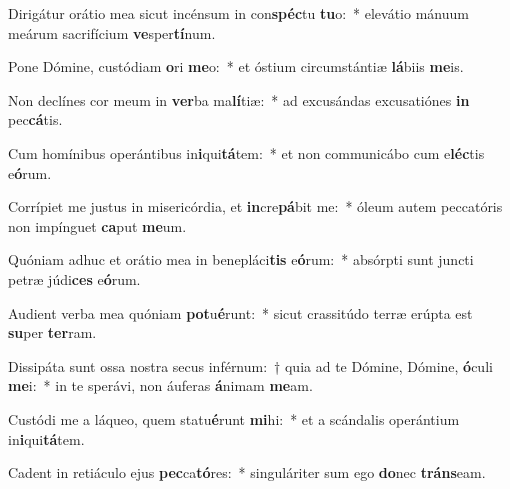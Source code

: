 \item Dirigátur orátio mea sicut incénsum in con\textbf{spéc}tu \textbf{tu}o:~* elevátio mánuum meárum sacrifícium \textbf{ve}sper\textbf{tí}num.
\item Pone Dómine, custódiam \textbf{o}ri \textbf{me}o:~* et óstium circumstántiæ \textbf{lá}biis \textbf{me}is.
\item Non declínes cor meum in \textbf{ver}ba ma\textbf{lí}tiæ:~* ad excusándas excusatiónes \textbf{in} pec\textbf{cá}tis.
\item Cum homínibus operántibus in\textbf{i}qui\textbf{tá}tem:~* et non communicábo cum e\textbf{léc}tis e\textbf{ó}rum.
\item Corrípiet me justus in misericórdia, et \textbf{in}cre\textbf{pá}bit me:~* óleum autem peccatóris non impínguet \textbf{ca}put \textbf{me}um.
\item Quóniam adhuc et orátio mea in benepláci\textbf{tis} e\textbf{ó}rum:~* absórpti sunt jun\-cti petræ júdi\textbf{ces} e\textbf{ó}rum.
\item Audient verba mea quóniam \textbf{pot}u\textbf{é}runt:~* sicut crassitúdo terræ erúpta est \textbf{su}per \textbf{ter}ram.
\item Dissipáta sunt ossa nostra secus inférnum:~† quia ad te Dómine, Dómine, \textbf{ó}culi \textbf{me}i:~* in te sperávi, non áuferas \textbf{á}nimam \textbf{me}am.
\item Custódi me a láqueo, quem statu\textbf{é}runt \textbf{mi}hi:~* et a scándalis operántium in\textbf{i}qui\textbf{tá}tem.
\item Cadent in retiáculo ejus \textbf{pec}ca\textbf{tó}res:~* singuláriter sum ego \textbf{do}nec \textbf{tráns}eam.
